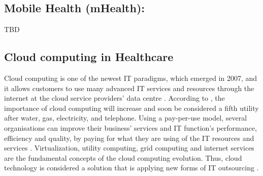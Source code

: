 \subsection{Mobile Health (mHealth):}

TBD

\subsection{Cloud computing in Healthcare}

Cloud computing is one of the newest IT paradigms, which emerged in 2007, and it allows customers to use many advanced IT services and resources through the internet at the cloud service providers’ data centre \cite{Sultan2014}. According to \citet{Buyya2009}, the importance of cloud computing will increase and soon be considered a fifth utility after water, gas, electricity, and telephone. Using a pay-per-use model, several organisations can improve their business’ services and IT function’s performance, efficiency and quality, by paying for what they are using of the IT resources and services \cite{Abdollahzadehgan2013}. Virtualization, utility computing, grid computing and internet services are the fundamental concepts of the cloud computing evolution. Thus, cloud technology is considered a solution that is applying new forms of IT outsourcing \cite{tashkandi2015cloud,Chang2013}.

